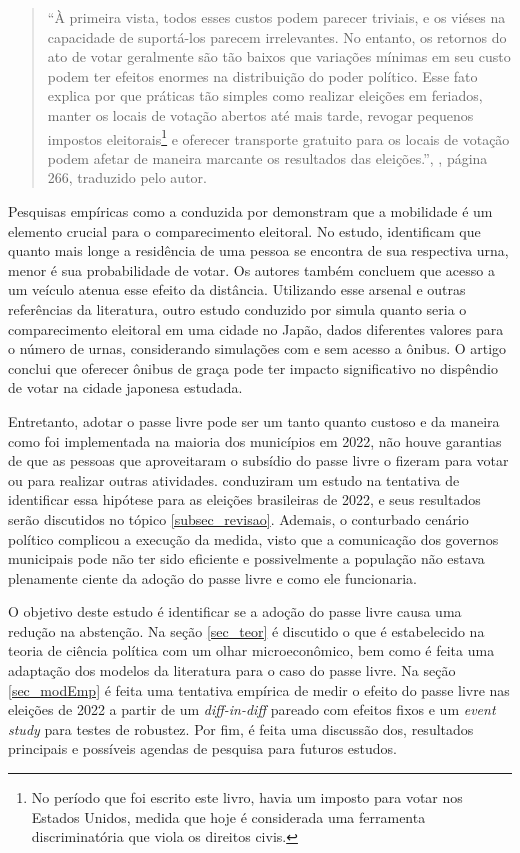 \begin{quote}
  ``À primeira vista, todos esses custos podem parecer triviais, e os viéses na capacidade de suportá-los parecem irrelevantes. No entanto, os retornos do ato de votar geralmente são tão baixos que variações mínimas em seu custo podem ter efeitos enormes na distribuição do poder político. Esse fato explica por que práticas tão simples como realizar eleições em feriados, manter os locais de votação abertos até mais tarde, revogar pequenos impostos eleitorais\footnote{No período que foi escrito este livro, havia um imposto para votar nos Estados Unidos, medida que hoje é considerada uma ferramenta discriminatória que viola os direitos civis.} 
  e oferecer transporte gratuito para os locais de votação podem afetar de maneira marcante os resultados das eleições.'', \textcite{downs1957economic}, página 266, traduzido pelo autor.
\end{quote}

Pesquisas empíricas como a conduzida por \textcite{haspel2005location} demonstram que a mobilidade é um elemento crucial para o comparecimento eleitoral. No estudo, identificam que quanto mais longe a residência de uma pessoa se encontra de sua respectiva urna, menor é sua probabilidade de votar. Os autores também concluem que acesso a um veículo atenua esse efeito da distância. Utilizando esse arsenal e outras referências da literatura, outro estudo conduzido por \textcite{konishi2010examination} simula quanto seria o comparecimento eleitoral em uma cidade no Japão, dados diferentes valores para o número de urnas, considerando simulações com e sem acesso a ônibus. O artigo conclui que oferecer ônibus de graça pode ter impacto significativo no dispêndio de votar na cidade japonesa estudada.

Entretanto, adotar o passe livre pode ser um tanto quanto custoso e da maneira como foi implementada na maioria dos municípios em 2022, não houve garantias de que as pessoas que aproveitaram o subsídio do passe livre o fizeram para votar ou para realizar outras atividades. \textcite{pereira2023transporte} conduziram um estudo na tentativa de identificar essa hipótese para as eleições brasileiras de 2022, e seus resultados serão discutidos no tópico \ref{subsec_revisao}. Ademais, o conturbado cenário político complicou a execução da medida, visto que a comunicação dos governos municipais pode não ter sido eficiente e possivelmente a população não estava plenamente ciente da adoção do passe livre e como ele funcionaria. 

O objetivo deste estudo é identificar se a adoção do passe livre causa uma redução na abstenção. Na seção \ref{sec_teor} é discutido o que é estabelecido na teoria de ciência política com um olhar microeconômico, bem como é feita uma adaptação dos modelos da literatura para o caso do passe livre. Na seção \ref{sec_modEmp} é feita uma tentativa empírica de medir o efeito do passe livre nas eleições de 2022 a partir de um \textit{diff-in-diff} pareado com efeitos fixos e um \textit{event study} para testes de robustez. Por fim, é feita uma discussão dos, resultados principais e possíveis agendas de pesquisa para futuros estudos.

